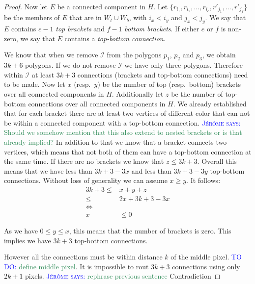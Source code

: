 \documentclass[a4paper, UKenglish]{lipics-v2018}
\newcommand{\mremark}[3]{\textcolor{blue}{\textsc{#1 #2:}} \textcolor{SeaGreen}{\textsf{#3}}}
\newcommand{\jerome}[2][says]{\mremark{J\'er\^ome}{#1}{#2}}
\newcommand{\todo}[2][DO]{\mremark{TO}{#1}{#2}}
\newcommand{\ixi}{\mathcal{I}}
\begin{document}
\begin{proof}
Now let $E$ be a connected component in $H$. Let $\{r_{i_1}, r_{i_2}, \dots, r_{i_e}, r'_{j_1}, \dots, r'_{j_f}\}$ be the members of $E$ that are in $W_t\cup W_b$, with $i_x<i_y$ and $j_x<j_y$. We say that $E$ contains $e-1$ \emph{top brackets} and $f-1$ \emph{bottom brackets}. If either $e$ or $f$ is non-zero, we say that $E$ contains a \emph{top-bottom connection}.

We know that when we remove $\ixi$ from the polygons $p_1$, $p_2$ and $p_3$, we obtain $3k+6$ polygons. If we do not remove $\ixi$ we have only three polygons. Therefore within $\ixi$ at least $3k+3$ connections (brackets and top-bottom connections) need to be made.
Now let $x$ (resp.\ $y$) be the number of top (resp.\ bottom) brackets over all connected components in $H$. Additionally let $z$ be the number of top-bottom connections over all connected components in $H$.
We already established that for each bracket there are at least two vertices of different color that can not be within a connected component with a top-bottom connection.
\jerome{Should we somehow mention that this also extend to nested brackets or is that already implied?}
In addition to that we know that a bracket connects two vertices, which means that not both of them can have a top-bottom connection at the same time.
If there are no brackets we know that $z\leq 3 k +3$.
Overall this means that we have less than $3k+3 - 3x$ and less than $3k+3 - 3y$ top-bottom connections.
Without loss of generality we can assume $x\geq y$.
It follows:
\begin{align*}
    3k+3\leq& x+y+z\\
    \leq& 2x + 3k+3 - 3x \\
    \iff& \\
    x&\leq 0 
\end{align*}

As we have $0\leq y\leq x$, this means that the number of brackets is zero. This implies we have $3k+3$ top-bottom connections.

However all the connections must be within distance $k$ of the middle pixel. \todo{define middle pixel}. It is impossible to rout $3k+3$ connections using only $2k+1$ pixels. \jerome{rephrase previous sentence}
Contradiction





\end{proof}
\end{document}
